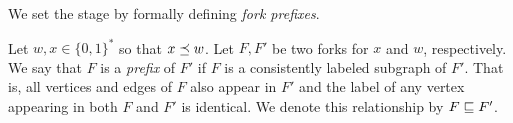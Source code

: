 





We set the stage by formally defining \emph{fork prefixes}.

\begin{definition}
Let $w, x \in\{0,1\}^*$ so that $x\preceq w$. 
Let $F, F'$ be two forks for $x$ and $w$, respectively. 
We say that $F$ is a \emph{prefix} of $F'$ if 
$F$ is a consistently labeled subgraph of $F'$. 
That is, all vertices and edges of $F$ also appear in $F'$ and 
the label of any vertex appearing in both $F$ and $F'$ is identical. 
We denote this relationship by $F\sqsubseteq F'$.
\end{definition}

